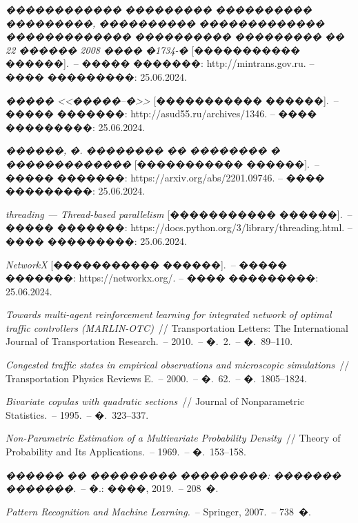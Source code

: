 \documentclass[11pt]{ubs}
\begin{document}
\begin{thebibliography}{10}
\textit{������������ ��������� ���������� ���������, ���������� ������������� ������������� ���������� ��������� �� 22 ������ 2008 ���� �1734-�} [����������� ������].~-- ����� �������: http://mintrans.gov.ru. -- ���� ���������: 25.06.2024.

\textit{����� <<�����--�>>} [����������� ������].~-- ����� �������: http://asud55.ru/archives/1346. -- ���� ���������: 25.06.2024.

\textit{������, �. �������� �� �������� � �������������} [����������� ������].~-- ����� �������: https://arxiv.org/abs/2201.09746. -- ���� ���������: 25.06.2024.

\textit{threading --- Thread-based parallelism} [����������� ������].~-- ����� �������: https://docs.python.org/3/library/threading.html. -- ���� ���������: 25.06.2024.

\textit{NetworkX} [����������� ������].~-- ����� �������: https://networkx.org/. -- ���� ���������: 25.06.2024.

 \textit{Towards multi-agent reinforcement learning for integrated network of optimal traffic controllers (MARLIN-OTC)}~// Transportation Letters: The International Journal of Transportation Research.~-- 2010.~-- �.~2.~-- �.~89--110.

 \textit{Congested traffic states in empirical observations and microscopic simulations}~// Transportation Physics Reviews E.~-- 2000.~-- �.~62.~-- �.~1805--1824.

 \textit{Bivariate copulas with quadratic sections}~// Journal of Nonparametric Statistics.~-- 1995.~-- �.~323--337.

 \textit{Non-Parametric Estimation of a Multivariate Probability Density}~// Theory of Probability and Its Applications.~-- 1969.~-- �.~153--158.


 \textit{������ �� ��������� ���������: ������� �������.}~-- �.: ����, 2019.~-- 208~�.

 \textit{Pattern Recognition and Machine Learning.}~-- Springer, 2007.~-- 738~�.


\end{thebibliography}
\end{document}

